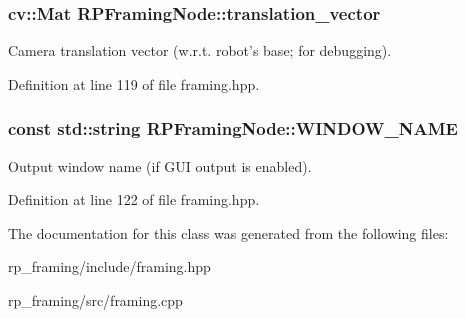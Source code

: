 \hypertarget{class_r_p_framing_node_a69f636be3f1cc2793e48596a1da71909}{
\subsubsection[{translation\-\_\-vector}]{\setlength{\rightskip}{0pt plus 5cm}cv\-::\-Mat {\bf \-R\-P\-Framing\-Node\-::translation\-\_\-vector}}}\label{class_r_p_framing_node_a69f636be3f1cc2793e48596a1da71909}
\-Camera translation vector (w.\-r.\-t. robot's base; for debugging). 

\-Definition at line 119 of file framing.\-hpp.

\hypertarget{class_r_p_framing_node_a144c66f7dcab4a463222f44d48128a5d}{
\subsubsection[{\-W\-I\-N\-D\-O\-W\-\_\-\-N\-A\-M\-E}]{\setlength{\rightskip}{0pt plus 5cm}const std\-::string {\bf \-R\-P\-Framing\-Node\-::\-W\-I\-N\-D\-O\-W\-\_\-\-N\-A\-M\-E}}}\label{class_r_p_framing_node_a144c66f7dcab4a463222f44d48128a5d}
\-Output window name (if \-G\-U\-I output is enabled). 

\-Definition at line 122 of file framing.\-hpp.



\-The documentation for this class was generated from the following files\-:\begin{DoxyCompactItemize}
\item 
rp\-\_\-framing/include/framing.\-hpp\item 
rp\-\_\-framing/src/framing.\-cpp\end{DoxyCompactItemize}
